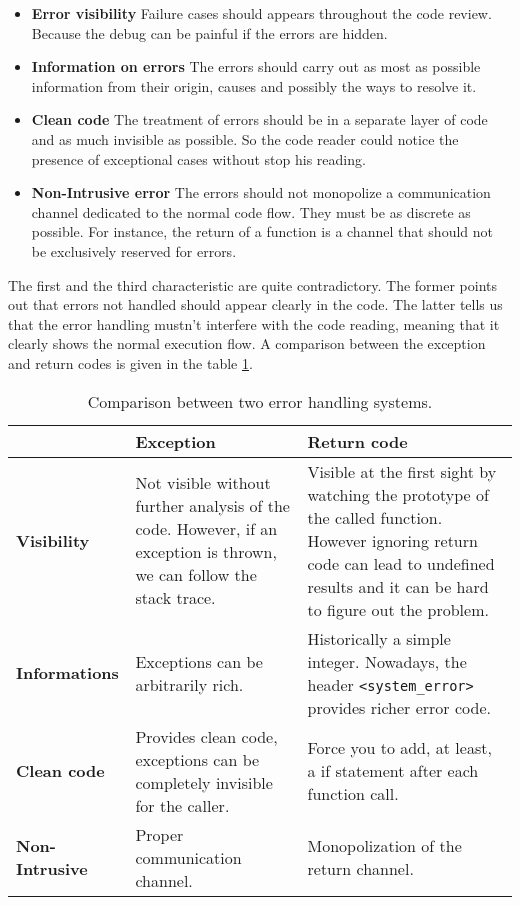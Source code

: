 \documentclass[a4paper,10pt]{article}
\newcommand{\cpp}[1]{\lstinline{#1}}
\begin{document}
\begin{itemize}
 \item \textbf{Error visibility} Failure cases should appears throughout the code review. Because the debug can be painful if the errors are hidden.
 \item \textbf{Information on errors} The errors should carry out as most as possible information from their origin, causes and possibly the ways to resolve it.
 \item \textbf{Clean code} The treatment of errors should be in a separate layer of code and as much invisible as possible. So the code reader could notice the presence of exceptional cases without stop his reading.
 \item \textbf{Non-Intrusive error} The errors should not monopolize a communication channel dedicated to the normal code flow. They must be as discrete as possible. For instance, the return of a function is a channel that should not be exclusively reserved for errors.
\end{itemize}

The first and the third characteristic are quite contradictory. The former points out that errors not handled should appear clearly in the code. The latter tells us that the error handling mustn't interfere with the code reading, meaning that it clearly shows the normal execution flow. A comparison between the exception and return codes is given in the table \ref{comp-handling-error}.


\begin{table}
\bgroup
\def\arraystretch{1.5}
\begin{tabular}{|l|>{\raggedright\arraybackslash}p{5cm}|>{\raggedright\arraybackslash}p{5cm}|}
\hline
                    & \textbf{Exception} & \textbf{Return code} \\
\hline
\textbf{Visibility} & Not visible without further analysis of the code. However, if an exception is thrown, we can follow the stack trace. & Visible at the first sight by watching the prototype of the called function. However ignoring return code can lead to undefined results and it can be hard to figure out the problem. \\
\hline
\textbf{Informations} & Exceptions can be arbitrarily rich. & Historically a simple integer. Nowadays, the header \cpp{<system_error>} provides richer error code. \\
\hline
\textbf{Clean code} & Provides clean code, exceptions can be completely invisible for the caller. & Force you to add, at least, a if statement after each function call. \\
\hline
\textbf{Non-Intrusive} & Proper communication channel. & Monopolization of the return channel. \\
\hline
\end{tabular}
\egroup
\caption{Comparison between two error handling systems.}
\label{comp-handling-error}
\end{table}
\end{document}
